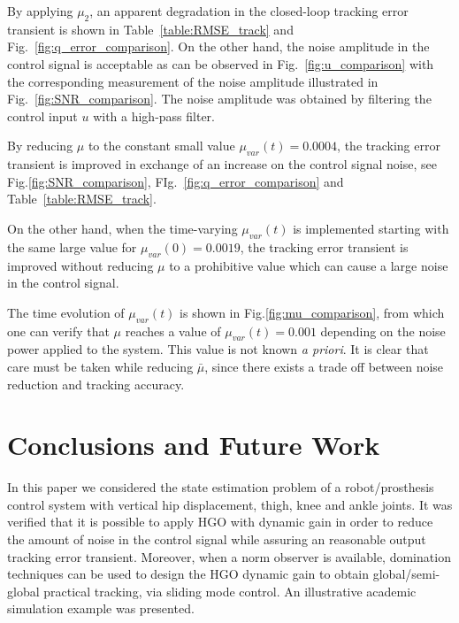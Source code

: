\documentclass[letterpaper, 10 pt, conference]{ieeeconf}  %
\theoremstyle{plain}
\theoremstyle{definition}
\theoremstyle{remark}
\begin{document}
%
By applying $\mu_{2}$, an apparent degradation in the closed-loop tracking error transient is shown in Table~\ref{table:RMSE_track} and Fig.~\ref{fig:q_error_comparison}. On the other hand, the noise amplitude in the control signal is acceptable as can be observed in Fig.~\ref{fig:u_comparison} with the corresponding measurement of the noise amplitude illustrated in Fig.~\ref{fig:SNR_comparison}. The noise amplitude was obtained by filtering the control input $u$ with a high-pass filter.
%

%
By reducing $\mu$ to the constant small value $\mu_{var}(t) = 0.0004$, the  tracking error transient is improved in exchange of an increase on the control signal noise, see  Fig.\ref{fig:SNR_comparison}, FIg.~\ref{fig:q_error_comparison} and Table~\ref{table:RMSE_track}.
%

%
On the other hand, when the time-varying $\mu_{var}(t)$ is implemented starting with the same large value for
$\mu_{var}(0) = 0.0019$, the tracking error transient is improved without reducing $\mu$ to a prohibitive value which can cause a large noise in the control signal. 
%

%
The time evolution of $\mu_{var}(t)$ is shown in Fig.\ref{fig:mu_comparison}, from which one can verify
that $\mu$ reaches a value of $\mu_{var}(t)=0.001$ depending on the noise power applied  to the system. 
This value is not known {\em a priori}. It is clear that care must be taken while reducing $\bar{\mu}$, since there exists a trade off between noise reduction and tracking accuracy.
%
%


\section{Conclusions and Future Work}
\label{sec:Conclusions}

In this paper we considered the state estimation problem of a robot/prosthesis control system with vertical hip displacement, thigh, knee and ankle joints.  It was verified that it is possible to apply HGO with dynamic gain in order to reduce the amount of noise in the control signal while assuring an reasonable output tracking error transient. Moreover, when a norm observer is available, domination techniques can be used to design the HGO dynamic gain to obtain global/semi-global practical tracking, via sliding mode control. An illustrative academic simulation example was presented.
\end{document}
